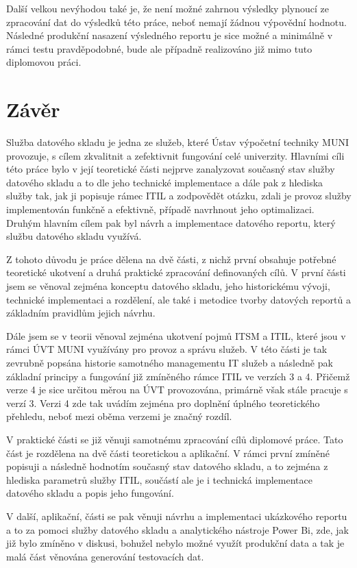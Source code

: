 \documentclass[
  digital,     %
  twoside,     %
  lof,         %
  lot,         %
]{fithesis4}
\begin{document}
Další velkou nevýhodou také je, že není možné zahrnou výsledky plynoucí ze zpracování dat do výsledků této práce, neboť nemají žádnou výpovědní hodnotu. Následné produkční nasazení výsledného reportu je sice možné a minimálně v rámci testu pravděpodobné, bude ale případně realizováno již mimo tuto diplomovou práci.  

\chapter{Závěr}
Služba datového skladu je jedna ze služeb, které Ústav výpočetní techniky MUNI provozuje, s cílem zkvalitnit a zefektivnit fungování celé univerzity. Hlavními cíli této práce bylo v její teoretické části nejprve zanalyzovat současný stav služby datového skladu a to dle jeho technické implementace a dále pak z hlediska služby tak, jak ji popisuje rámec ITIL a zodpovědět otázku, zdali je provoz služby implementován funkčně a efektivně, případě navrhnout jeho optimalizaci. Druhým hlavním cílem pak byl návrh a implementace datového reportu, který službu datového skladu využívá.

Z tohoto důvodu je práce dělena na dvě části, z nichž první obsahuje potřebné teoretické ukotvení a druhá praktické zpracování definovaných cílů. V první části jsem se věnoval zejména konceptu datového skladu, jeho historickému vývoji, technické implementaci a rozdělení, ale také i metodice tvorby datových reportů a základním pravidlům jejich návrhu. 

Dále jsem se v teorii věnoval zejména ukotvení pojmů ITSM a ITIL, které jsou v rámci ÚVT MUNI využívány pro provoz a správu služeb. V této části je tak zevrubně popsána historie samotného managementu IT služeb a následně pak základní principy a fungování již zmíněného rámce ITIL ve verzích 3 a 4. Přičemž verze 4 je sice určitou měrou na ÚVT provozována, primárně však stále pracuje s verzí 3. Verzi 4 zde tak uvádím zejména pro doplnění úplného teoretického přehledu, neboť mezi oběma verzemi je značný rozdíl. 


V praktické části se již věnuji samotnému zpracování cílů diplomové práce. Tato část je rozdělena na dvě části teoretickou a aplikační. V rámci první zmíněné popisuji a následně hodnotím současný stav datového skladu, a to zejména z hlediska parametrů služby ITIL, součástí ale je i technická implementace datového skladu a popis jeho fungování. 

V další, aplikační, části se pak věnuji návrhu a implementaci ukázkového reportu a to za pomoci služby datového skladu a analytického nástroje Power Bi, zde, jak již bylo zmíněno v diskusi, bohužel nebylo možné využít produkční data a tak je malá část věnována generování testovacích dat.
\end{document}
